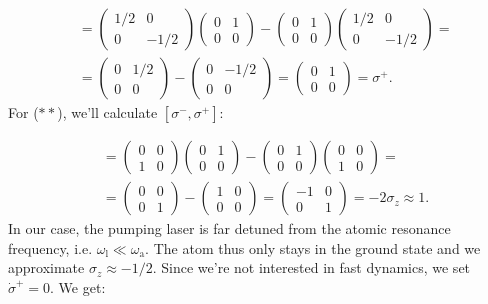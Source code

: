 \begin{align}
[\sigma_z, \sigma^+] & = \begin{pmatrix}1/2 & 0 \\ 0 & -1/2\end{pmatrix} \begin{pmatrix}0 & 1 \\ 0 & 0\end{pmatrix} - \begin{pmatrix}0 & 1 \\ 0 & 0\end{pmatrix} \begin{pmatrix}1/2 & 0 \\ 0 & -1/2\end{pmatrix} = \nonumber \\[5pt]
& = \begin{pmatrix}0 & 1/2 \\ 0 & 0\end{pmatrix} - \begin{pmatrix}0 & -1/2 \\ 0 & 0\end{pmatrix} = \begin{pmatrix}0 & 1 \\ 0 & 0\end{pmatrix} = \sigma^+.
\end{align}For ($\ast \ast$), we'll calculate $[\sigma^-, \sigma^+]$:

\begin{align}
[\sigma^-, \sigma^+] & = \begin{pmatrix}0 & 0 \\ 1 & 0\end{pmatrix} \begin{pmatrix}0 & 1 \\ 0 & 0\end{pmatrix} - \begin{pmatrix}0 & 1 \\ 0 & 0\end{pmatrix} \begin{pmatrix}0 & 0 \\ 1 & 0\end{pmatrix} = \nonumber \\[5pt]
& = \begin{pmatrix}0 & 0 \\ 0 & 1\end{pmatrix} - \begin{pmatrix}1 & 0 \\ 0 & 0\end{pmatrix} = \begin{pmatrix}-1 & 0 \\ 0 & 1\end{pmatrix} = -2\sigma_z \approx 1.
\end{align}In our case, the pumping laser is far detuned from the atomic resonance frequency, i.e. $\omega_\text{l} \ll \omega_\text{a}$. The atom thus only stays in the ground state and we approximate $\sigma_z \approx -1/2$. Since we're not interested in fast dynamics, we set $\dot{\sigma}^+ = 0$. We get:

